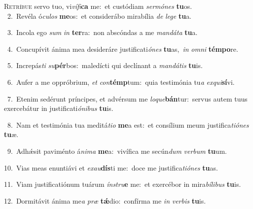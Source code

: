 \lettrine{\initial\textcolor{\initialcolor}{R}}{etríbue} servo tuo, vi\-\textit{ví}\-\textit{fi}\textbf{ca} me:~\star et custódiam \textit{ser}\-\textit{mó}\textit{nes} \textbf{tu}\-os.\\
{\numbfont\textcolor{\numbcolor}{~2.}}~Revéla ó\-\textit{cu}\-\textit{los} \textbf{me}\-os:~\star et considerábo mirabília \textit{de} \textit{le}\-\textit{ge} \textbf{tu}\-a.\par
{\numbfont\textcolor{\numbcolor}{~3.}}~Incola ego \textit{sum} \textit{in} \textbf{ter}\-ra:~\star non abscóndas a me \textit{man}\-\textit{dá}\textit{ta} \textbf{tu}\-a.\par
{\numbfont\textcolor{\numbcolor}{~4.}}~Concupívit ánima mea desideráre justificati\-\textit{ó}\-\textit{nes} \textbf{tu}\-as,~\star \textit{in} \textit{om}\-\textit{ni} \textbf{tém}\-\textbf{po}re.\par
{\numbfont\textcolor{\numbcolor}{~5.}}~Increpás\textit{ti} \textit{su}\-\textbf{pér}bos:~\star maledícti qui declínant a \textit{man}\-\textit{dá}\textit{tis} \textbf{tu}\-is.\par
{\numbfont\textcolor{\numbcolor}{~6.}}~Aufer a me oppróbrium, \textit{et} \textit{con}\-\textbf{témp}tum:~\star quia testimónia tu\textit{a} \textit{ex}\-\textit{qui}\textbf{sí}vi.\par
{\numbfont\textcolor{\numbcolor}{~7.}}~Etenim sedérunt príncipes, et advérsum me \textit{lo}\-\textit{que}\textbf{bán}tur:~\star servus autem tuus exercebátur in justificati\-\textit{ó}\-\textit{ni}\textit{bus} \textbf{tu}\-is.\par
{\numbfont\textcolor{\numbcolor}{~8.}}~Nam et testimónia tua meditá\-\textit{ti}\-\textit{o} \textbf{me}\-a est:~\star et consílium meum justifica\-\textit{ti}\-\textit{ó}\textit{nes} \textbf{tu}\-æ.\par
{\numbfont\textcolor{\numbcolor}{~9.}}~Adhǽsit paviménto á\-\textit{ni}\-\textit{ma} \textbf{me}\-a:~\star vivífica me secún\textit{dum} \textit{ver}\-\textit{bum} \textbf{tu}\-um.\par
{\numbfont\textcolor{\numbcolor}{10.}}~Vias meas enuntiávi et \textit{ex}\-\textit{au}\textbf{dís}ti me:~\star doce me justifica\-\textit{ti}\-\textit{ó}\textit{nes} \textbf{tu}\-as.\par
{\numbfont\textcolor{\numbcolor}{11.}}~Viam justificatiónum tuárum \textit{ín}\-\textit{stru}\textbf{e} me:~\star et exercébor in mira\-\textit{bí}\-\textit{li}\textit{bus} \textbf{tu}\-is.\par
{\numbfont\textcolor{\numbcolor}{12.}}~Dormitávit ánima me\textit{a} \textit{præ} \textbf{tǽ}\-dio:~\star confírma me \textit{in} \textit{ver}\-\textit{bis} \textbf{tu}\-is.\par
